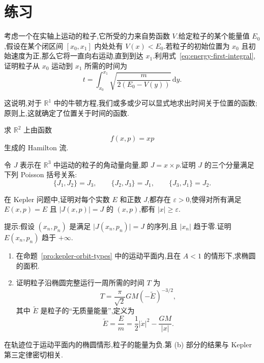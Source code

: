 \section{练习}

\begin{exercise}\label{ex:travel-time}
考虑一个在实轴上运动的粒子,它所受的力来自势函数 $V$.给定粒子的某个能量值 $E_{0}$,假设在某个闭区间 $[x_{0},x_{1}]$ 内处处有 $V(x)<E_{0}$.若粒子的初始位置为 $x_{0}$ 且初始速度为正,那么它将一直向右运动,直到到达 $x_{1}$.利用式~\eqref{eq:energy-first-integral},证明粒子从 $x_{0}$ 运动到 $x_{1}$ 所需的时间为
\[
  t=\int_{x_{0}}^{x_{1}}\sqrt{\frac{m}{2(E_{0}-V(y))}}\,\mathrm{d}y.
\]
\begin{note}
这说明,对于 $\mathbb{R}^{1}$ 中的牛顿方程,我们或多或少可以显式地求出时间关于位置的函数;原则上,这就确定了位置关于时间的函数.
\end{note}
\end{exercise}

\begin{exercise}\label{ex:xp-flow}
求 $\mathbb{R}^{2}$ 上由函数
\[
  f(x,p)=xp
\]
生成的 Hamilton 流.
\end{exercise}

\begin{exercise}\label{ex:angular-poisson-algebra}
令 $J$ 表示在 $\mathbb{R}^{3}$ 中运动的粒子的角动量向量,即 $J=x\times p$.证明 $J$ 的三个分量满足下列 Poisson 括号关系:
\[
  \{J_{1},J_{2}\}=J_{3},\qquad
  \{J_{2},J_{3}\}=J_{1},\qquad
  \{J_{3},J_{1}\}=J_{2}.
\]
\end{exercise}

\begin{exercise}\label{ex:kepler-minimum-radius}
在 Kepler 问题中,证明对每个实数 $E$ 和正数 $J$,都存在 $\varepsilon>0$,使得对所有满足 $E(x,p)=E$ 且 $\lvert J(x,p)\rvert=J$ 的 $(x,p)$,都有 $\lvert x\rvert\geq\varepsilon$.
\begin{note}
提示:假设 $(x_{n},p_{n})$ 是满足 $\lvert J(x_{n},p_{n})\rvert=J$ 的序列,且 $\lvert x_{n}\rvert$ 趋于零.证明 $E(x_{n},p_{n})$ 趋于 $+\infty$.
\end{note}
\end{exercise}

\begin{exercise}\label{ex:kepler-period}
\begin{enumerate}[label=(\alph*)]
  \item 在命题~\ref{pro:kepler-orbit-types} 中的运动平面内,且在 $A<1$ 的情形下,求椭圆的面积.
  \item 证明粒子沿椭圆完整运行一周所需的时间 $T$ 为
  \[
    T=\frac{\pi}{\sqrt{2}}GM(-\widetilde{E})^{-3/2},
  \]
  其中 $\widetilde{E}$ 是粒子的“无质量能量”,定义为
  \[
    \widetilde{E}=\frac{E}{m}=\frac12\lvert\dot{x}\rvert^{2}-\frac{GM}{\lvert x\rvert}.
  \]
\end{enumerate}
\begin{note}
在轨迹位于运动平面内的椭圆情形,粒子的能量为负.第 (b) 部分的结果与 Kepler 第三定律密切相关.
\end{note}
\end{exercise}

